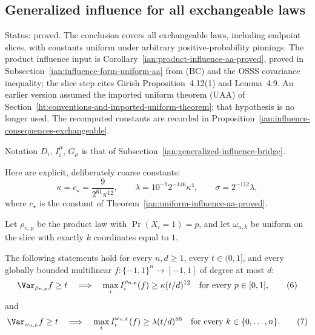 \subsection{Generalized influence for all exchangeable laws}
\label{ian:exchangeable-generalized-influence}

Status: proved. The conclusion covers all exchangeable laws, including
endpoint slices, with constants uniform under arbitrary
positive-probability pinnings. The product influence input is
Corollary~\ref{ian:product-influence-aa-proved}, proved in
Subsection~\ref{ian:influence-form-uniform-aa} from (BC) and the OSSS
covariance inequality; the slice step cites Girish
Proposition~4.12(1) and Lemma~4.9. An earlier version assumed the imported uniform
theorem (UAA) of
Section~\ref{ht:conventions-and-imported-uniform-theorem}; that
hypothesis is no longer used. The recomputed constants are recorded in
Proposition~\ref{ian:influence-consequences-exchangeable}.

Notation \(D_i\), \(I_i^\mu\), \(G_\mu\) is that of
Subsection~\ref{ian:generalized-influence-bridge}.

Here are explicit, deliberately coarse constants:
\[
 \kappa=c_\star=\frac{9}{2^{61}\pi^{12}},\qquad
 \lambda=10^{-9}2^{-146}\kappa^4,\qquad
 \sigma=2^{-112}\lambda,
 \tag{5}\label{ian:exchangeable-constants}
\]
where \(c_\star\) is the constant of
Theorem~\ref{ian:uniform-influence-aa-proved}.

Let \(\rho_{n,p}\) be the product law with
\(\Pr(X_i=1)=p\), and let \(\omega_{n,k}\) be uniform on the slice with
exactly \(k\) coordinates equal to \(1\).

\begin{lemma}
\label{ian:uniform-product-slice-aa}
The following statements hold for every \(n,d\ge1\),
every \(t\in(0,1]\), and every globally bounded multilinear
\(f:\{-1,1\}^n\to[-1,1]\) of degree at most \(d\):
\[
 \Var_{\rho_{n,p}}f\ge t
 \quad\Longrightarrow\quad
 \max_i I_i^{\rho_{n,p}}(f)\ge\kappa(t/d)^{12}
 \quad\text{for every }p\in[0,1],
 \tag{6}\label{ian:uniform-product-bound}
\]
and
\[
 \Var_{\omega_{n,k}}f\ge t
 \quad\Longrightarrow\quad
 \max_i I_i^{\omega_{n,k}}(f)\ge\lambda(t/d)^{56}
 \quad\text{for every }k\in\{0,\ldots,n\}.
 \tag{7}\label{ian:uniform-slice-bound}
\]
\end{lemma}

